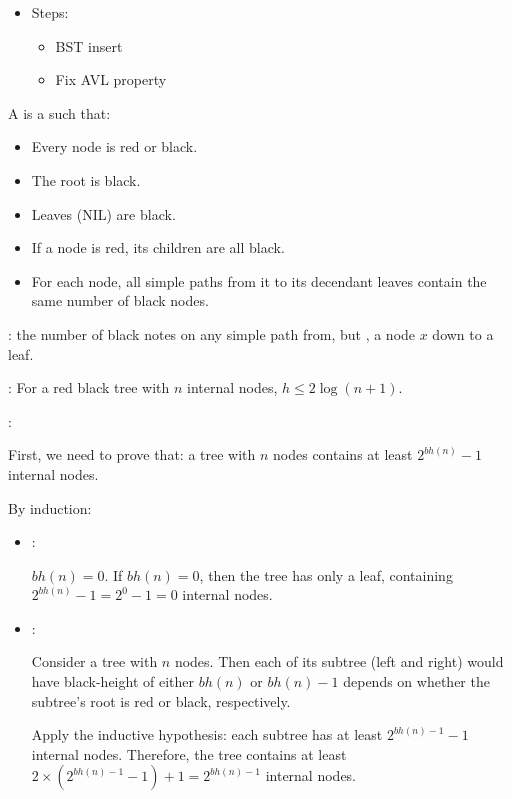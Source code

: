     \begin{itemize}
      \item {}
        \par Steps:
        \begin{itemize}
          \item BST insert
          \item Fix AVL property
        \end{itemize}
    \end{itemize}


    \par A  is a  such that:
    \begin{itemize}
      \item Every node is red or black.
      \item The root is black.
      \item Leaves (NIL) are black.
      \item If a node is red, its children are all black.
      \item For each node, all simple paths from it to its decendant leaves
        contain the same number of black nodes.
    \end{itemize}
    \par {}: the number of black notes on any simple path
      from, but , a node $x$ down to a leaf.
    \par {}: For a red black tree with $n$ internal nodes,
      $h \leq 2\log(n + 1)$.
    \par {}:
    \par First, we need to prove that: a tree with $n$ nodes contains
    at least $2^{bh(n)} - 1$ internal nodes.
    \par By induction:
      \begin{itemize}
        \item {}:
          \par $bh(n) = 0$. If $bh(n) = 0$, then the tree has only a leaf,
          containing $2^{bh(n)} - 1 = 2^{0} - 1 = 0$ internal nodes.
        \item {}:
          \par Consider a tree with $n$ nodes. Then each of its subtree
          (left and right) would have black-height of either
          $bh(n)$ or $bh(n) - 1$ depends on
          whether the subtree's root is red or black, respectively.
          \par Apply the inductive hypothesis: each subtree has at least 
          $2^{bh(n) - 1} - 1$ internal nodes. Therefore, the tree
          contains at least $2 \times (2^{bh(n) - 1} - 1) + 1 = 2^{bh(n) - 1}$
          internal nodes.
      \end{itemize}
